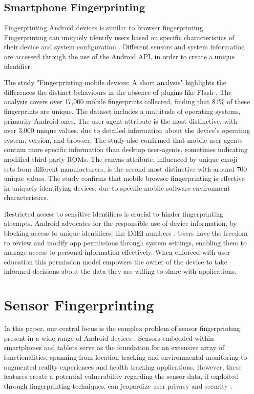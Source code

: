\documentclass[11pt,
  oneside,openany,    %
]{scrreprt}
\begin{document}
\section{Smartphone Fingerprinting}
\label{sec:smartphone_fingerprint}
Fingerprinting Android devices is similar to browser fingerprinting.
Fingerprinting can uniquely identify users based on specific characteristics of their device and system configuration \cite{10.1145/3407023.3407055}. 
Different sensors and system information are accessed through the use of the Android API, in order to create a unique identifier.

The study "Fingerprinting mobile devices: A short analysis" highlights the differences the distinct behaviours in the absence of plugins like Flash \cite{gomez2017fingerprinting}.
The analysis covers over 17,000 mobile fingerprints collected, finding that 81\% of these fingerprints are unique. 
The dataset includes a multitude of operating systems, primarily Android ones.
The user-agent attribute is the most distinctive, with over 3,000 unique values, due to detailed information about the device's operating system, version, and browser. 
The study also confirmed that mobile user-agents contain more specific information than desktop user-agents, sometimes indicating modified third-party ROMs.
The canvas attribute, influenced by unique emoji sets from different manufacturers, is the second most distinctive with around 700 unique values.
The study confirms that mobile browser fingerprinting is effective in uniquely identifying devices, due to specific mobile software environment characteristics.

Restricted access to sensitive identifiers is crucial to hinder fingerprinting attempts. 
Android advocates for the responsible use of device information, by blocking access to unique identifiers, like IMEI numbers \cite{android_privacy_10, meng2023post}.
Users have the freedom to review and modify app permissions through system settings, enabling them to manage access to personal information effectively. 
When enforced with user education this permission model empowers the owner of the device to take informed decisions about the data they are willing to share with applications.

\chapter{Sensor Fingerprinting}
\label{chap:sensor_fingerprint}
In this paper, our central focus is the complex problem of sensor fingerprinting present in a wide range of Android devices \cite{baldini2017survey}. 
Sensors embedded within smartphones and tablets serve as the foundation for an extensive array of functionalities, spanning from location tracking and environmental monitoring to augmented reality experiences and health tracking applications. 
However, these features create a potential vulnerability regarding the sensor data, if exploited through fingerprinting techniques, can jeopardize user privacy and security \cite{meng2023post}.
\end{document}
